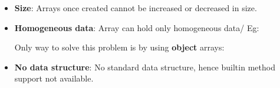 \setlength{\columnsep}{3pt}
\begin{flushleft}
	
	\begin{itemize}
		\item \textbf{Size}: Arrays once created cannot be increased or decreased in size.
		\item \textbf{Homogeneous data}: Array can hold only homogeneous data/
		\newline
		Eg:
		
		Only way to solve this problem is by using \textbf{object} arrays:
		
		\item \textbf{No data structure}: No standard data structure, hence builtin method support not available.
		
	\end{itemize}
	
\end{flushleft}



